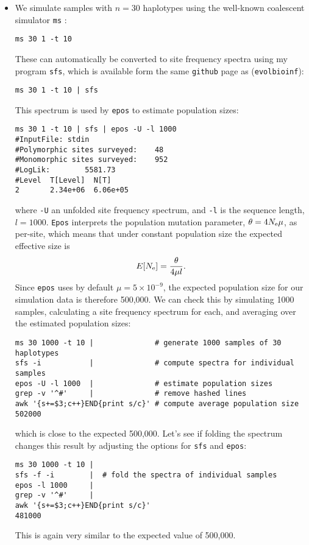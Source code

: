 \documentclass[a4paper]{article}
\newcommand{\ty}{\texttt}
\begin{document}
\begin{itemize}
\item We simulate samples with
  $n=30$ haplotypes using the well-known coalescent simulator \ty{ms} \citep{hud02:gen}:
\begin{verbatim}
ms 30 1 -t 10 
\end{verbatim}
These can automatically be converted to site frequency spectra using
my program \ty{sfs}, which is available form the same 
\ty{github} page as (\ty{evolbioinf}):
\begin{verbatim}
ms 30 1 -t 10 | sfs
\end{verbatim}
This spectrum is used by \ty{epos} to estimate population
sizes:
\begin{verbatim}
ms 30 1 -t 10 | sfs | epos -U -l 1000
#InputFile:	stdin
#Polymorphic sites surveyed:	48
#Monomorphic sites surveyed:	952
#LogLik:		5581.73
#Level  T[Level]  N[T]
2       2.34e+06  6.06e+05
\end{verbatim}
where \ty{-U} an unfolded site frequency spectrum, and \ty{-l} is the
sequence length, $l=1000$. \ty{Epos} interprets the population
mutation parameter, $\theta=4N_{\rm e}\mu$, as per-site, which means that under constant population size
the expected effective size is
\[
E[N_{\rm e}]=\frac{\theta}{4\mu l}.
\]
Since \ty{epos} uses by default $\mu=5\times 10^{-9}$, 
the expected population size for our simulation data
 is therefore 500,000. We can check this
by simulating 1000 samples, calculating a site frequency
spectrum for each, and averaging over the estimated population sizes:
\begin{verbatim}
ms 30 1000 -t 10 |              # generate 1000 samples of 30 haplotypes
sfs -i           |              # compute spectra for individual samples
epos -U -l 1000  |              # estimate population sizes
grep -v '^#'     |              # remove hashed lines
awk '{s+=$3;c++}END{print s/c}' # compute average population size
502000
\end{verbatim}
which is close to the expected 500,000. Let's see if folding the
spectrum changes this result by adjusting the options for \ty{sfs} and
\ty{epos}:
\begin{verbatim}
ms 30 1000 -t 10 | 
sfs -f -i        |  # fold the spectra of individual samples
epos -l 1000     |  
grep -v '^#'     |
awk '{s+=$3;c++}END{print s/c}'
481000
\end{verbatim}
This is again very similar to the expected value of 500,000.
\end{itemize}
\end{document}

